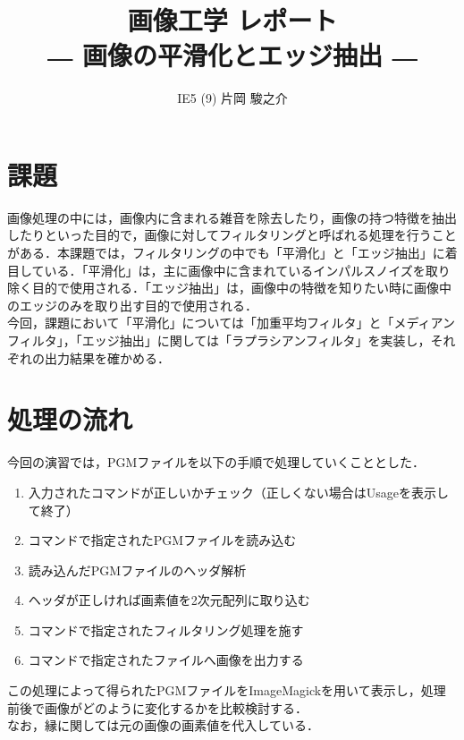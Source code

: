 \documentclass{jsarticle}
\begin{document}
\title{画像工学 レポート\\ \vspace{1cm}― 画像の平滑化とエッジ抽出 ―\vspace{2cm}}
\author{IE5 (9) 片岡 駿之介 \vspace{1cm}}
\maketitle

\newpage

\section{課題}

画像処理の中には，画像内に含まれる雑音を除去したり，画像の持つ特徴を抽出したりといった目的で，画像に対してフィルタリングと呼ばれる処理を行うことがある．本課題では，フィルタリングの中でも「平滑化」と「エッジ抽出」に着目している．「平滑化」は，主に画像中に含まれているインパルスノイズを取り除く目的で使用される．「エッジ抽出」は，画像中の特徴を知りたい時に画像中のエッジのみを取り出す目的で使用される．\\
今回，課題において「平滑化」については「加重平均フィルタ」と「メディアンフィルタ」，「エッジ抽出」に関しては「ラプラシアンフィルタ」を実装し，それぞれの出力結果を確かめる．

\section{処理の流れ}

今回の演習では，PGMファイルを以下の手順で処理していくこととした．
\begin{enumerate}
  \item 入力されたコマンドが正しいかチェック（正しくない場合はUsageを表示して終了）
  \item コマンドで指定されたPGMファイルを読み込む
  \item 読み込んだPGMファイルのヘッダ解析
  \item ヘッダが正しければ画素値を2次元配列に取り込む
  \item コマンドで指定されたフィルタリング処理を施す
  \item コマンドで指定されたファイルへ画像を出力する
\end{enumerate}

この処理によって得られたPGMファイルをImageMagickを用いて表示し，処理前後で画像がどのように変化するかを比較検討する．\\
なお，縁に関しては元の画像の画素値を代入している．
\newpage
\end{document}
